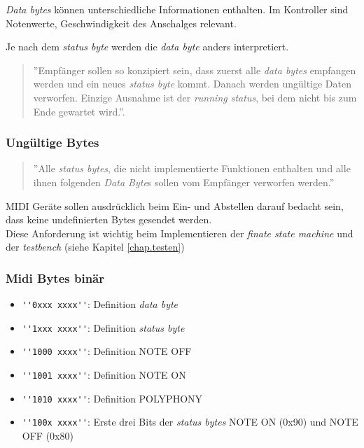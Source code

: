 \textit{Data bytes} können unterschiedliche Informationen enthalten. Im Kontroller sind Notenwerte, Geschwindigkeit des Anschalges relevant.

Je nach dem \textit{status byte} werden die \textit{data byte} anders interpretiert. 

\begin{quote}
''Empfänger sollen so konzipiert sein, dass zuerst alle \textit{data bytes} empfangen werden und ein neues \textit{status byte} kommt. Danach werden ungültige Daten verworfen. Einzige Ausnahme ist der \textit{running status}, bei dem nicht bis zum Ende gewartet wird.''\cite{Midi_specification}.
\end{quote}

\subsubsection*{Ungültige Bytes}

\begin{quote}
''Alle \textit{status bytes}, die nicht implementierte Funktionen enthalten und alle ihnen folgenden \textit{Data Byte}s sollen vom Empfänger verworfen werden.'' \cite{Midi_specification}
\end{quote}

MIDI Geräte sollen ausdrücklich beim Ein- und Abstellen darauf bedacht sein, dass keine undefinierten Bytes gesendet werden\cite{Midi_specification}.\\
Diese Anforderung ist wichtig beim Implementieren der \textit{finate state machine} und der \textit{testbench} (siehe Kapitel \ref{chap.testen})

\subsubsection*{Midi Bytes binär}\label{midi_binaer}

\begin{itemize}
	\item \lstinline|''0xxx xxxx''|: Definition \textit{data byte}
	\item \lstinline|''1xxx xxxx''|: Definition \textit{status byte}
	\item \lstinline|''1000 xxxx''|: Definition NOTE OFF
	\item \lstinline|''1001 xxxx''|: Definition NOTE ON
	\item \lstinline|''1010 xxxx''|: Definition POLYPHONY
	\item \lstinline|''100x xxxx''|: Erste drei Bits der \textit{status bytes} NOTE ON (0x90) und NOTE OFF (0x80)
\end{itemize}
\newpage
